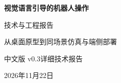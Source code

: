

\hypersetup{pageanchor=false}
\begin{titlepage}
\centering
\vspace*{28mm}
{\songti\bfseries{}视觉语言引导的机器人操作\par}
\vspace{7mm}
{\songti{}技术与工程报告\par}
\vspace{15mm}
{从桌面原型到同场景仿真与端侧部署\par}
\vfill
{中文版 v0.3\quad 详细技术报告\par}
\vspace{5mm}
{2026年11月22日\par}
\vspace*{22mm}
\end{titlepage}
\frontmatter
\hypersetup{pageanchor=true}

\tableofcontents
\listoffigures
\listoftables
\mainmatter









\appendix




\backmatter



